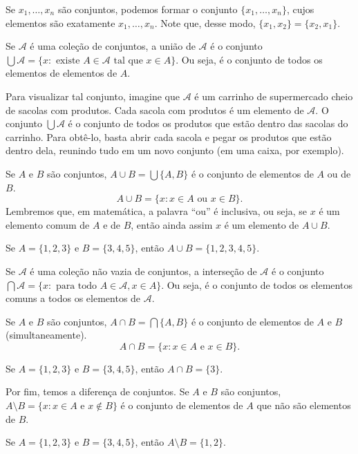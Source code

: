 Se $x_1, \dots, x_n$ são conjuntos, podemos formar o conjunto $\{x_1, \dots, x_n\}$, cujos elementos são exatamente $x_1, \dots, x_n$.
Note que, desse modo, $\{x_1, x_2\}=\{x_2, x_1\}$.

Se $\mathcal A$ é uma coleção de conjuntos, a união de $\mathcal A$ é o conjunto $\bigcup \mathcal A=\{x: \text{ existe } A\in \mathcal A \text{ tal que } x\in A\}$.
Ou seja, é o conjunto de todos os elementos de elementos de $A$.

Para visualizar tal conjunto, imagine que $\mathcal A$ é um carrinho de supermercado cheio de sacolas com produtos.
Cada sacola com produtos é um elemento de $\mathcal A$.
O conjunto $\bigcup \mathcal A$ é o conjunto de todos os produtos que estão dentro das sacolas do carrinho.
Para obtê-lo, basta abrir cada sacola e pegar os produtos que estão dentro dela, reunindo tudo em um novo conjunto (em uma caixa, por exemplo).

Se $A$ e $B$ são conjuntos, $A\cup B=\bigcup \{A, B\}$ é o conjunto de elementos de $A$ ou de $B$.
\[
    A\cup B=\{x: x\in A \text{ ou } x\in B\}.
\]
Lembremos que, em matemática, a palavra ``ou'' é inclusiva, ou seja, se $x$ é um elemento comum de $A$ e de $B$, então ainda assim $x$ é um elemento de $A\cup B$.

\begin{example}
    Se $A=\{1, 2, 3\}$ e $B=\{3, 4, 5\}$, então $A\cup B=\{1, 2, 3, 4, 5\}$.
\end{example}

Se $\mathcal A$ é uma coleção não vazia de conjuntos, a interseção de $\mathcal A$ é o conjunto $\bigcap \mathcal A=\{x: \text{ para todo } A\in \mathcal A, x\in A\}$.
Ou seja, é o conjunto de todos os elementos comuns a todos os elementos de $\mathcal A$.

Se $A$ e $B$ são conjuntos, $A\cap B=\bigcap \{A, B\}$ é o conjunto de elementos de $A$ e $B$ (simultaneamente).
\[
    A\cap B=\{x: x\in A \text{ e } x\in B\}.
\]

\begin{example}
    Se $A=\{1, 2, 3\}$ e $B=\{3, 4, 5\}$, então $A\cap B=\{3\}$.
\end{example}

Por fim, temos a diferença de conjuntos.
Se $A$ e $B$ são conjuntos, $A\setminus B=\{x: x\in A \text{ e } x\notin B\}$ é o conjunto de elementos de $A$ que não são elementos de $B$.
\begin{example}
    Se $A=\{1, 2, 3\}$ e $B=\{3, 4, 5\}$, então $A\setminus B=\{1, 2\}$.
\end{example}

